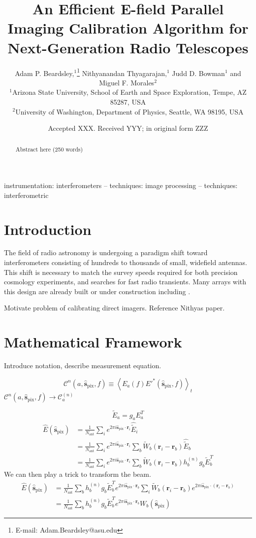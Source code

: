\documentclass[a4paper,fleqn,usenatbib]{../mnras}
\title[E-field Parallel Imaging Calibration]{An Efficient E-field Parallel Imaging Calibration Algorithm for Next-Generation Radio Telescopes}
\author[Beardsley et al.]{
Adam P. Beardsley,$^{1}$\thanks{E-mail: Adam.Beardsley@asu.edu}
Nithyanandan Thyagarajan,$^{1}$
Judd D. Bowman$^{1}$
\newauthor
and Miguel F. Morales$^{2}$
\\
$^{1}$Arizona State University, School of Earth and Space Exploration, Tempe, AZ 85287, USA\\
$^{2}$University of Washington, Department of Physics, Seattle, WA 98195, USA\\
}
\date{Accepted XXX. Received YYY; in original form ZZZ}
\newcommand{\spix}{\hat{\mathbf{s}}_{\mathrm{pix}}}
\newcommand{\Cna}{\mathcal{C}^{(n)}_a}
\newcommand{\ri}{\mathbf{r}_i}
\newcommand{\rb}{\mathbf{r}_b}
\newcommand{\Nant}{N_{\mathrm{ant}}}
\newcommand{\beamr}{\widetilde{W}}
\newcommand{\beamtheta}{W}
\newcommand{\Er}[1]{\widetilde{E}_{#1}}
\newcommand{\Erest}[1]{\hat{\widetilde{E}}_{#1}}
\begin{document}
\label{firstpage}
\pagerange{\pageref{firstpage}--\pageref{lastpage}}
\maketitle

\begin{abstract}
Abstract here (250 words)
\end{abstract}

\begin{keywords}
instrumentation: interferometers -- techniques: image processing -- techniques: interferometric
\end{keywords}



\section{Introduction}
The field of radio astronomy is undergoing a paradigm shift toward interferometers consisting of hundreds to thousands of small, widefield antennas. This shift is necessary to match the survey speeds required for both precision cosmology experiments, and searches for fast radio transients. Many arrays with this design are already built or under construction including \cite{XXX}. 





Motivate problem of calibrating direct imagers. Reference Nithyas paper. \citep{mor11}

\section{Mathematical Framework}

Introduce notation, describe measurement equation.


\begin{equation}
\mathcal{C}^n(a,\spix,f) \equiv \left<E_a(f) E'^*(\spix,f)\right>_t
\end{equation}
$\mathcal{C}^n(a,\spix,f) \rightarrow \Cna$

\begin{equation}
\Er{a} = g_a E^T_a
\end{equation}
\begin{align}
\hat{E}(\spix) & = \frac{1}{\Nant} \sum_i e^{2\pi i \spix \cdot \ri} \Erest{i} \\
& = \frac{1}{\Nant} \sum_i e^{2\pi i \spix \cdot \ri} \sum_b \beamr_b(\ri-\rb) \Erest{b} \\
& = \frac{1}{\Nant} \sum_i e^{2\pi i \spix \cdot \ri} \sum_b \beamr_b(\ri-\rb) h^{(n)}_b g_b\Er{b}^T
\end{align}
We can then play a trick to transform the beam.
\begin{align}
\hat{E}(\spix) & = \frac{1}{\Nant} \sum_b h^{(n)}_b g_b\Er{b}^T e^{2\pi i \spix \cdot \rb}\sum_i \beamr_b(\ri-\rb)e^{2\pi i \spix \cdot (\ri-\rb)}\\
& = \frac{1}{\Nant} \sum_b h^{(n)}_b g_b\Er{b}^T e^{2\pi i \spix \cdot \rb}\beamtheta_b(\spix)
\end{align}
\end{document}
